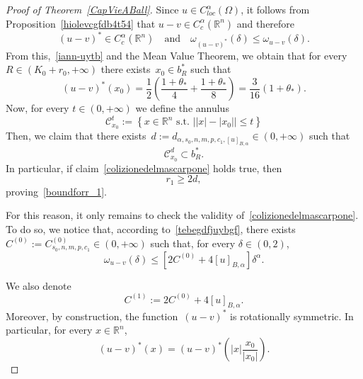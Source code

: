 \documentclass[12pt]{article}
\newcommand{\R}{\mathbb{R}}
\numberwithin{equation}{section}
\renewcommand{\leq}{\leqslant}
\renewcommand{\geq}{\geqslant}
\begin{document}
\begin{proof}[Proof of Theorem~\ref{CapVieABall}]
Since $u\in C_{\textit{loc}}^\alpha(\Omega)$, it follows from Proposition~\ref{hiolevcgfdb4t54}
that $u-v\in C_c^\alpha(\R^n)$ and therefore  
\begin{equation}\label{fvd-098}
(u-v)^*\in C_c^\alpha(\R^n)\quad\mbox{and}\quad \omega_{(u-v)^*}(\delta)\leq \omega_{u-v}(\delta).
\end{equation}
From this,~\eqref{iann-uytb} and the Mean Value Theorem, we obtain that for every $R\in\left(K_0+r_0,+\infty\right)$
there exists~$x_0\in b_R^*$ such that 
\begin{equation}\label{cre-8}
(u-v)^*(x_0)=\frac{1}{2}\left(\frac{1+\theta_*}{4}+\frac{1+\theta_*}{8}\right)= \frac{3}{16}\left(1+\theta_*\right).
\end{equation}
Now, for every $t\in (0,+\infty)$ we define the annulus 
\begin{equation*}
\mathcal{C}_{x_0}^t:=\left\lbrace x\in\R^n\mbox{ s.t. } \left| \left|x\right|-\left|x_0\right|\right|\leq t  \right\rbrace
\end{equation*}
Then, we claim that there exists~$d:=d_{\alpha,s_0,n,m,p,c_1,\left[u\right]_{B,\alpha}}\in (0,+\infty)$ such that 
\begin{equation}\label{colizionedelmascarpone}
\mathcal{C}_{x_0}^d \subset b_R^*.
\end{equation}
In particular, if claim~\eqref{colizionedelmascarpone} holds true, then   
\begin{equation*}
r_1\geq 2d,
\end{equation*}
proving~\eqref{boundforr_1}. 

For this reason, it only remains to check the validity of~\eqref{colizionedelmascarpone}. 
To do so, we notice that, according to~\eqref{tebegdfjuybgf}, there exists~$C^{(0)}:=C_{s_0,n,m,p,c_1}^{(0)}\in(0,+\infty)$ such that, for every $\delta\in(0,2)$,
\begin{equation}\label{gbvdy-76yh}
\omega_{u-v}(\delta) \leq \left[2C^{(0)}+4\left[u\right]_{B,\alpha}\right] \delta^\alpha.
\end{equation}

We also denote 
\begin{equation*}
C^{(1)}:=2C^{(0)}+4\left[u\right]_{B,\alpha}.
\end{equation*} 
Moreover, by construction, the function~$(u-v)^*$ is rotationally symmetric. In particular, for every $x\in \R^n$,
\begin{equation*}
(u-v)^* (x)=(u-v)^* \left(\left|x\right|\frac{x_0}{\left|x_0 \right|}   \right). 
\end{equation*} 


\end{proof}
\end{document}
